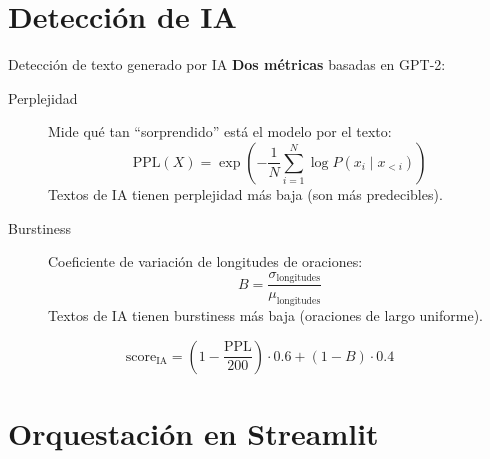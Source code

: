 \documentclass[aspectratio=169]{beamer}
\begin{document}
\section{Detección de IA}

\begin{frame}{Detección de texto generado por IA}
  \textbf{Dos métricas} basadas en GPT-2:
  \vspace{0.5em}
  \begin{description}
    \item[Perplejidad] Mide qué tan ``sorprendido'' está el modelo por el texto:
          \[
          \text{PPL}(X) = \exp\left(-\frac{1}{N}\sum_{i=1}^{N} \log P(x_i \mid x_{<i})\right)
          \]
          Textos de IA tienen perplejidad más baja (son más predecibles).

    \item[Burstiness] Coeficiente de variación de longitudes de oraciones:
          \[
          B = \frac{\sigma_{\text{longitudes}}}{\mu_{\text{longitudes}}}
          \]
          Textos de IA tienen burstiness más baja (oraciones de largo uniforme).
  \end{description}
  \vspace{0.5em}
  \[
  \boxed{\text{score}_{\text{IA}} = \left(1 - \frac{\text{PPL}}{200}\right) \cdot 0.6 + (1 - B) \cdot 0.4}
  \]
\end{frame}

\section{Orquestación en Streamlit}
\end{document}
